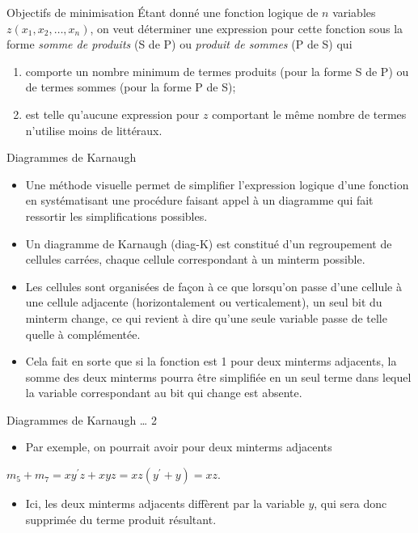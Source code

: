 \documentclass[presentation]{beamer}
\begin{document}
\begin{frame}[label={sec:org78e2969}]{Objectifs de minimisation}
Étant donné une fonction logique de \(n\) variables \(z(x_1, x_2, \ldots, x_n)\), on veut déterminer une expression pour cette fonction sous la forme \emph{somme de produits} (S de P) ou \emph{produit de sommes} (P de S) qui

\begin{enumerate}
\item comporte un nombre minimum de termes produits (pour la forme S de P)
ou de termes sommes (pour la forme P de S);

\item est telle qu'aucune expression pour \(z\) comportant le même nombre
de termes n'utilise moins de littéraux.
\end{enumerate}
\end{frame}

\begin{frame}[label={sec:orgb08dcf8}]{Diagrammes de Karnaugh}
\begin{itemize}
\item Une méthode visuelle permet de simplifier l'expression logique d'une fonction en systématisant une procédure faisant appel à un diagramme qui fait ressortir les simplifications possibles.

\item Un diagramme de Karnaugh (diag-K) est constitué d'un regroupement de cellules carrées, chaque cellule correspondant à un minterm possible.

\item Les cellules sont organisées de façon à ce que lorsqu'on passe d'une cellule à une cellule adjacente (horizontalement ou verticalement), un seul bit du minterm change, ce qui revient à dire qu'une seule variable passe de telle quelle à complémentée.

\item Cela fait en sorte que si la fonction est 1 pour deux minterms adjacents, la somme des deux minterms pourra être simplifiée en un seul terme dans lequel la variable correspondant au bit qui change est absente.
\end{itemize}
\end{frame}

\begin{frame}[label={sec:org8978d05}]{Diagrammes de Karnaugh \ldots{} 2}
\begin{itemize}
\item Par exemple, on pourrait avoir pour deux minterms adjacents
\end{itemize}

\(m_5 + m_7 = xy^\prime z + xyz = xz(y^\prime + y) = xz\). 

\begin{itemize}
\item Ici, les deux minterms adjacents diffèrent par la variable \(y\), qui sera donc supprimée du terme produit résultant.
\end{itemize}
\end{frame}
\end{document}
